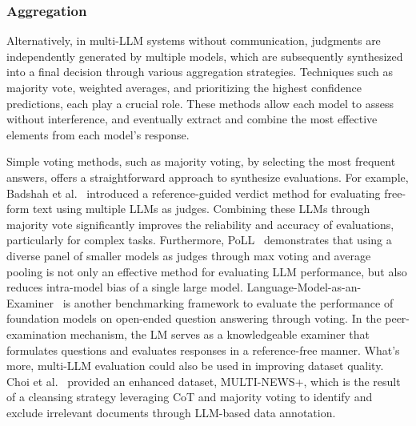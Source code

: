 \subsubsection{Aggregation}
\label{sec:Aggregation}

Alternatively, in multi-LLM systems without communication, judgments are independently generated by multiple models, which are subsequently synthesized into a final decision through various aggregation strategies. Techniques such as majority vote, weighted averages, and prioritizing the highest confidence predictions, each play a crucial role. These methods allow each model to assess without interference, and eventually extract and combine the most effective elements from each model's response.

Simple voting methods, such as majority voting, by selecting the most frequent answers, offers a straightforward approach to synthesize evaluations.
For example, Badshah et al.~\cite{badshah2024reference} introduced a reference-guided verdict method for evaluating free-form text using multiple LLMs as judges. Combining these LLMs through majority vote significantly improves the reliability and accuracy of evaluations, particularly for complex tasks.
Furthermore, PoLL~\cite{verga2024replacing} demonstrates that using a diverse panel of smaller models as judges through max voting and average pooling is not only an effective method for evaluating LLM performance, but also reduces intra-model bias of a single large model.
Language-Model-as-an-Examiner~\cite{bai2024benchmarking} is another benchmarking framework to evaluate the performance of foundation models on open-ended question answering through voting. In the peer-examination mechanism, the LM serves as a knowledgeable examiner that formulates questions and evaluates responses in a reference-free manner.
What's more, multi-LLM evaluation could also be used in improving dataset quality. Choi et al.~\cite{choi2024multi} provided an enhanced dataset, MULTI-NEWS+, which is the result of a cleansing strategy leveraging CoT and majority voting to identify and exclude irrelevant documents through LLM-based data annotation.

